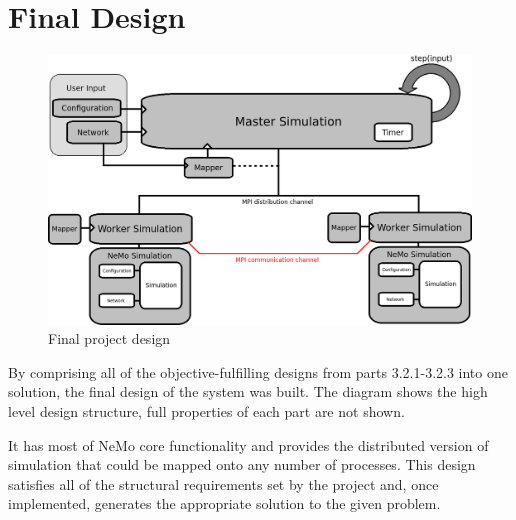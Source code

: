 \clearpage

\section{Final Design}

\begin{figure}[h]
\begin{center}
\includegraphics[scale = 0.45]{images/final_design.png}
\end{center}
\caption{Final project design}
\end{figure}

By comprising all of the objective-fulfilling designs from parts 3.2.1-3.2.3 into one solution, the final design of the system was built. The diagram shows the high level design structure, full properties of each part are not shown.

It has most of NeMo core functionality and provides the distributed version of simulation that could be mapped onto any number of processes. This design satisfies all of the structural requirements set by the project and, once implemented, generates the appropriate solution to the given problem.
